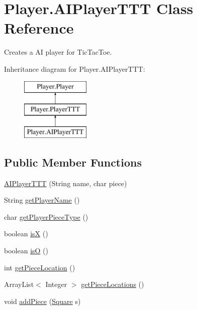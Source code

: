 \hypertarget{class_player_1_1_a_i_player_t_t_t}{}\section{Player.\+A\+I\+Player\+T\+T\+T Class Reference}
\label{class_player_1_1_a_i_player_t_t_t}


Creates a A\+I player for Tic\+Tac\+Toe.  


Inheritance diagram for Player.\+A\+I\+Player\+T\+T\+T\+:\begin{figure}[H]
\begin{center}
\leavevmode
\includegraphics[height=3.000000cm]{class_player_1_1_a_i_player_t_t_t}
\end{center}
\end{figure}
\subsection*{Public Member Functions}
\begin{DoxyCompactItemize}
\item 
\hyperlink{class_player_1_1_a_i_player_t_t_t_ae14ec8ce7a73f91b999f61b3682d4d2a}{A\+I\+Player\+T\+T\+T} (String name, char piece)
\item 
String \hyperlink{class_player_1_1_a_i_player_t_t_t_aacc073468526cff79faa6ed3ab1ab58f}{get\+Player\+Name} ()
\item 
char \hyperlink{class_player_1_1_a_i_player_t_t_t_a9e15cc9460330e6c70e8b8f8b1ad420c}{get\+Player\+Piece\+Type} ()
\item 
boolean \hyperlink{class_player_1_1_a_i_player_t_t_t_af22521a88989d915f9942c05136c0138}{is\+X} ()
\item 
boolean \hyperlink{class_player_1_1_a_i_player_t_t_t_a46635ecc04b552870b7932c075abb83c}{is\+O} ()
\item 
int \hyperlink{class_player_1_1_a_i_player_t_t_t_a720325103f04baf7e91f74f38aae2dee}{get\+Piece\+Location} ()
\item 
Array\+List$<$ Integer $>$ \hyperlink{class_player_1_1_a_i_player_t_t_t_a134185b132dcb9caec6293b9e4c6f66f}{get\+Piece\+Locations} ()
\item 
void \hyperlink{class_player_1_1_a_i_player_t_t_t_a1892cf5a0820045fb9658892af0b1ea7}{add\+Piece} (\hyperlink{class_square_1_1_square}{Square} s)
\end{DoxyCompactItemize}
